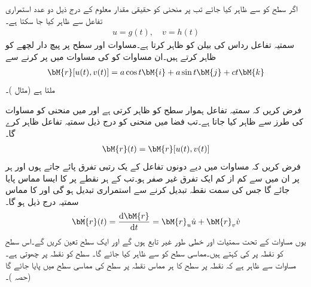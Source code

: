 اگر سطح  کو  سے ظاہر کیا جائے تب  پر منحنی کو حقیقی مقدار معلوم  کے درج ذیل دو عدد استمراری تفاعل سے ظاہر کیا جا سکتا ہے۔
\begin{align}\label{مساوات_خطی_تکمل_سطح_میں_منحنی_الف}
u=g(t),\quad v=h(t)
\end{align}
\quad سمتیہ  تفاعل  رداس  کی بیلن  کو ظاہر کرتا ہے۔مساوات  اور  سطح  پر پیچ دار لچھے کو ظاہر کرتے ہیں۔ان مساوات کو  کی مساوات میں پر کرنے سے
\begin{align*}
\bM{r}[u(t),v(t)]=a\cos t\bM{i}+a\sin t\bM{j}+ct\bM{k}
\end{align*}
ملتا ہے (مثال )۔

فرض کریں کہ سمتیہ  تفاعل  ہموار سطح  کو ظاہر کرتی ہے اور  میں منحنی  کو مساوات  کی طرز سے ظاہر کیا جاتا ہے۔تب فضا میں منحنی  کو درج ذیل سمتیہ  تفاعل ظاہر کرے گا۔
\begin{align}\label{مساوات_خطی_تکمل_سطح_میں_منحنی_ب}
\bM{r}(t)=\bM{r}[u(t),v(t)]
\end{align}
فرض کریں کہ مساوات   میں دیے دونوں تفاعل کے یک رتبی تفرق پائے جاتے ہوں اور ہر  پر ان میں سے  کم از کم ایک تفرق غیر صفر ہو۔تب  کے ہر نقطے  پر  کا ایسا مماس پایا جائے گا جس کی سمت نقطہ تبدیل کرنے سے استمراری تبدیل ہو گی اور  کا مماس سمتیہ درج ذیل ہو گا۔
\begin{align*}
\dot{\bM{r}}(t)=\frac{\dif \bM{r}}{\dif t}=\bM{r}_u\dot{u}+\bM{r}_v\dot{v}
\end{align*}
یوں مساوات  کے تحت سمتیات  اور
  خطی طور غیر تابع ہوں گے اور ایک سطح تعین کریں گے۔اس سطح کو  نقطہ  پر  کی  کہتے ہیں۔مماسی سطح کو  سے ظاہر کیا جائے گا۔ سطح  کو نقطہ  پر چھوتی ہے۔ مساوات  سے ظاہر ہے کہ  نقطہ  پر سطح  کا ہر مماس نقطہ  پر سطح کی مماسی سطح  میں پایا جائے گا (حصہ )۔

